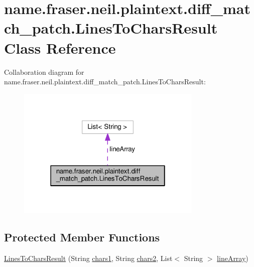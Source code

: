 \hypertarget{classname_1_1fraser_1_1neil_1_1plaintext_1_1diff__match__patch_1_1LinesToCharsResult}{}\section{name.\+fraser.\+neil.\+plaintext.\+diff\+\_\+match\+\_\+patch.\+Lines\+To\+Chars\+Result Class Reference}
\label{classname_1_1fraser_1_1neil_1_1plaintext_1_1diff__match__patch_1_1LinesToCharsResult}


Collaboration diagram for name.\+fraser.\+neil.\+plaintext.\+diff\+\_\+match\+\_\+patch.\+Lines\+To\+Chars\+Result\+:
\nopagebreak
\begin{figure}[H]
\begin{center}
\leavevmode
\includegraphics[width=250pt]{classname_1_1fraser_1_1neil_1_1plaintext_1_1diff__match__patch_1_1LinesToCharsResult__coll__graph}
\end{center}
\end{figure}
\subsection*{Protected Member Functions}
\begin{DoxyCompactItemize}
\item 
\hyperlink{classname_1_1fraser_1_1neil_1_1plaintext_1_1diff__match__patch_1_1LinesToCharsResult_a84f1e05e90368f0ca66d32c3d17983aa}{Lines\+To\+Chars\+Result} (String \hyperlink{classname_1_1fraser_1_1neil_1_1plaintext_1_1diff__match__patch_1_1LinesToCharsResult_a12daa534c2a4957abadb025674e5258d}{chars1}, String \hyperlink{classname_1_1fraser_1_1neil_1_1plaintext_1_1diff__match__patch_1_1LinesToCharsResult_a6dec911e50bdb1eeefb8d0e586b7d91f}{chars2}, List$<$ String $>$ \hyperlink{classname_1_1fraser_1_1neil_1_1plaintext_1_1diff__match__patch_1_1LinesToCharsResult_a3cf66c74c672cf71959901cacd01fdd4}{line\+Array})
\end{DoxyCompactItemize}
